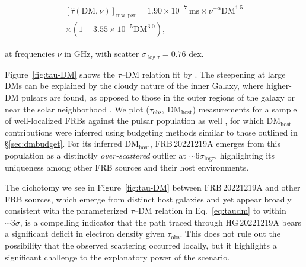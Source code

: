 \documentclass[twocolumn, linenumbers, tra]{aastex631}
\newcommand{\nihari}{FRB\,20221219A } %
\begin{document}
\begin{equation}\label{eq:taudm}
\begin{aligned}
\left[\widehat{\tau}\left(\mathrm{DM}, \nu\right)\right]_{\mathrm{mw}, \mathrm{psr}} = 1.90 \times 10^{-7} \mathrm{\ ms} \times \nu^{-\alpha} \mathrm{DM}^{1.5} \\
\times\left(1+3.55 \times 10^{-5} \mathrm{DM}^{3.0}\right),
\end{aligned}
\end{equation}

\noindent
at frequencies $\nu$ in GHz, with scatter $\sigma_{\log \tau}=0.76$ dex. 

Figure\ \ref{fig:tau-DM} shows the $\tau$--$\mathrm{DM}$ relation fit by \citet{Cordes2016}. The steepening at large DMs can be explained by the cloudy nature of the inner Galaxy, where higher-DM pulsars are found, as opposed to those in the outer regions of the galaxy or near the solar neighborhood \citep{Cordes1991, Cordes2019}. We plot ($\tau_{\mathrm{obs}},\ \mathrm{DM}_{\mathrm{host}}$) measurements for a sample of well-localized FRBs against the pulsar population as well \citep{Tendulkar2017, Marcote2017, Marcote2020, Prochaska2019b, Bannister2019, Bhandari2020, Macquart2020, Day2020, Day2021, Ocker2022b}, for which DM$_{\mathrm{host}}$ contributions were inferred using budgeting methods similar to those outlined in \S\protect\ref{sec:dmbudget}. For its inferred DM$_{\mathrm{host}}$, \nihari emerges from this population as a distinctly \textit{over-scattered} outlier at $ \sim 6\sigma_{\mathrm{log}\tau}$, highlighting its uniqueness among other FRB sources and their host environments.

{The dichotomy we see in Figure\ \ref{fig:tau-DM} between \nihari and other FRB sources, which emerge from distinct host galaxies and yet appear broadly consistent with the parameterized $\tau$--DM relation in Eq.~\ref{eq:taudm} to within $ \sim 3\sigma$, is a compelling indicator that the path traced through HG\,20221219A bears a significant deficit in electron density given $\tau_{\mathrm{obs}}$. This does not rule out the possibility that the observed scattering occurred locally, but it highlights a significant challenge to the explanatory power of the scenario.} 
\end{document}
